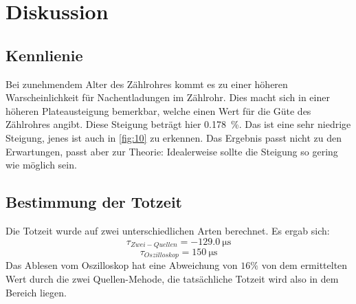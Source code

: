 \section{Diskussion}
\label{sec:Diskussion}

\subsection{Kennlienie}
Bei zunehmendem Alter des Zählrohres kommt es zu einer höheren Warscheinlichkeit 
für Nachentladungen im Zählrohr. Dies macht sich in einer höheren Plateausteigung 
bemerkbar, welche einen Wert für die Güte des Zählrohres angibt.
Diese Steigung beträgt hier \qty{0.178}{\%}. Das ist eine sehr niedrige Steigung,
jenes ist auch in \autoref{fig:10} zu erkennen. Das Ergebnis passt nicht zu 
den Erwartungen, passt aber zur Theorie: Idealerweise sollte die Steigung so 
gering wie möglich sein.

\subsection{Bestimmung der Totzeit}
Die Totzeit wurde auf zwei unterschiedlichen Arten berechnet.
Es ergab sich: 
\begin{equation}
    \tau_{Zwei-Quellen} = \qty{-129.0}{\micro\second} 
\end{equation}
\begin{equation}
    \tau_{Oszilloskop} = \qty{150}{\micro\second} 
\end{equation}
Das Ablesen vom Oszilloskop hat eine Abweichung von $16 \%$ von dem 
ermittelten Wert durch die zwei Quellen-Mehode, die tatsächliche 
Totzeit wird also in dem Bereich liegen.